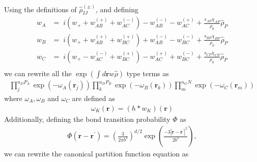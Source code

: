 \documentclass{article}
\begin{document}
\noindent Using the definitions of $\hat{\rho}_{IJ}^{(\pm)}$, and defining
\begin{align*}
  w_A &=\;
    i \left( w_+ + w_{AB}^{(+)} + w_{AC}^{(-)} \right)
    - w_{AB}^{(-)} - w_{AC}^{(+)}
    + \frac{s_{AP}\chi_{AP}}{\rho_0} \hat{\rho}_P \\
  w_B &=\;
    i \left( w_+ + w_{AB}^{(+)} + w_{BC}^{(+)} \right)
    + w_{AB}^{(-)} - w_{BC}^{(-)}
    + \frac{s_{BP}\chi_{BP}}{\rho_0} \hat{\rho}_P \\
  w_C &=\;
    i \left( w_+ - w_{AC}^{(-)} + w_{BC}^{(+)} \right)
    - w_{AC}^{(+)} + w_{BC}^{(-)}
    + \frac{s_{CP}\chi_{CP}}{\rho_0} \hat{\rho}_P \\
\end{align*}
  we can rewrite all the $\exp(\int d \mathbf{r} w\hat{\rho})$ type terms as
\begin{align*}
  \prod_{j}^{n_{D}P_{A}}
  \exp \left( -\omega_A(\mathbf{r}_j) \right)
  \prod_{k}^{n_{D}P_{B}}
  \exp \left( -\omega_B(\mathbf{r}_k) \right)
  \prod_{m}^{n_{G}N_{}}
  \exp \left( -\omega_C(\mathbf{r}_m) \right)
\end{align*}
where $\omega_A, \omega_B$ and $\omega_C$ are defined as
\begin{align*}
  \omega_K(\mathbf{r}) = (h \ast w_K)(\mathbf{r})
\end{align*}
Additionally, defining the bond transition probability $\Phi$ as
\begin{align*}
  \Phi(\mathbf{r} - \mathbf{r}^\prime) =
    \left( \frac{3}{2\pi b^2} \right) ^ {d/2}
    \exp \left( \frac{-3| \mathbf{r} - \mathbf{r}^\prime |^2}{2b^2} \right),
\end{align*}
we can rewrite the canonical partition function equation as
\end{document}
